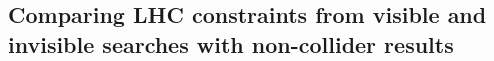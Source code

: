 





\subsection{Comparing LHC constraints from visible and invisible searches with non-collider results}



